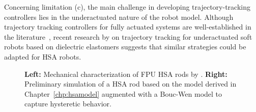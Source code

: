 Concerning limitation (c), the main challenge in developing trajectory-tracking controllers lies in the underactuated nature of the robot model. Although trajectory tracking controllers for fully actuated systems are well-established in the literature~\citep{della2020model}, recent research by \citet{soleti2025model} on trajectory tracking for underactuated soft robots based on dielectric elastomers suggests that similar strategies could be adapted for \gls{HSA} robots.

\begin{figure}[ht]
    \centering
    \caption{\textbf{Left:} Mechanical characterization of FPU \gls{HSA} rods by \citet{truby2021recipe}. \textbf{Right:} Preliminary simulation of a \gls{HSA} rod based on the model derived in Chapter~\ref{chp:hsamodel} augmented with a Bouc-Wen model to capture hysteretic behavior.}
    \label{fig:conclusion_future_work:hsa_control:hysteresis}
\end{figure}

